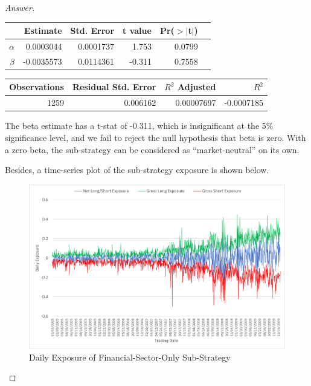 \documentclass[10pt]{article}
\begin{document}
\begin{enumerate}
\begin{enumerate}
\begin{proof}[Answer]
\begin{table}[ht]
\centering
\begin{tabular}{rrrrrr}
  \hline
 & Estimate & Std. Error & t value & Pr($>$$|$t$|$)\\ 
  \hline
$\alpha$ & 0.0003044 & 0.0001737 & 1.753 & 0.0799 \\ 
  $\beta$ & -0.0035573 & 0.0114361 & -0.311 & 0.7558 \\
   \hline
\end{tabular}

\medskip
\begin{tabular}{rrrr}
    \hline
     Observations  & Residual Std. Error  &  $R^2$     Adjusted & $R^2$ \\
     \hline
    1259        &     0.006162    &     0.00007697      & -0.0007185      \\
     \hline
\end{tabular}
\end{table} 
        
        The beta estimate has a t-stat of -0.311, which is insignificant at the 5\% significance level, and we fail to reject the null hypothesis that beta is zero. With a zero beta, the sub-strategy can be considered as ``market-neutral'' on its own.
        
        \medskip
        Besides, a time-series plot of the sub-strategy exposure is shown below.
        
        \begin{figure}[ht]
            \centering
            \includegraphics[scale = 0.7]{Q4d2.png}
            \caption{Daily Exposure of Financial-Sector-Only Sub-Strategy}
        \end{figure}
        

\end{proof}
\end{enumerate}
\end{enumerate}
\end{document}
